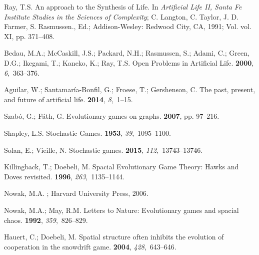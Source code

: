 \documentclass[journal,article,accept,oneauthor,pdftex,10pt,a4paper,games]{mdpi}
\begin{document}
\begin{thebibliography}{999}
Ray, T.S.
\newblock An approach to the Synthesis of Life. In {\em Artificial Life II,
  Santa Fe Institute Studies in the Sciences of Complexity}; {C. Langton, C.
  Taylor, J. D. Farmer, S. Rasmussen}., Ed.; Addison-Wesley: Redwood City, CA,
  1991; Vol. vol. XI, pp. 371--408.

Bedau, M.A.; McCaskill, J.S.; Packard, N.H.; Rasmussen, S.; Adami, C.; Green,
  D.G.; Ikegami, T.; Kaneko, K.; Ray, T.S.
\newblock Open Problems in Artificial Life.
 {\bf 2000}, {\em 6},~363--376.

Aguilar, W.; Santamaría-Bonfil, G.; Froese, T.; Gershenson, C.
\newblock The past, present, and future of artificial life.
 {\bf 2014}, {\em 8},~1--15.

Szabó, G.; Fáth, G.
\newblock Evolutionary games on graphs.
 {\bf 2007}, pp. 97--216.

Shapley, L.S.
\newblock Stochastic Games.
 {\bf 1953}, {\em 39},~1095--1100.

Solan, E.; Vieille, N.
\newblock Stochastic games.
 {\bf 2015},
  {\em 112},~13743--13746.

Killingback, T.; Doebeli, M.
\newblock Spacial Evolutionary Game Theory: Hawks and Doves revisited.
 {\bf 1996}, {\em
  263},~1135--1144.

Nowak, M.A.
; Harvard
  University Press,  2006.

Nowak, M.A.; May, R.M.
\newblock Letters to Nature: Evolutionary games and spacial chaos.
 {\bf 1992}, {\em 359},~826--829.

Hauert, C.; Doebeli, M.
\newblock Spatial structure often inhibits the evolution of cooperation in the
  snowdrift game.
 {\bf 2004}, {\em 428},~643--646.


\end{thebibliography}
\end{document}
